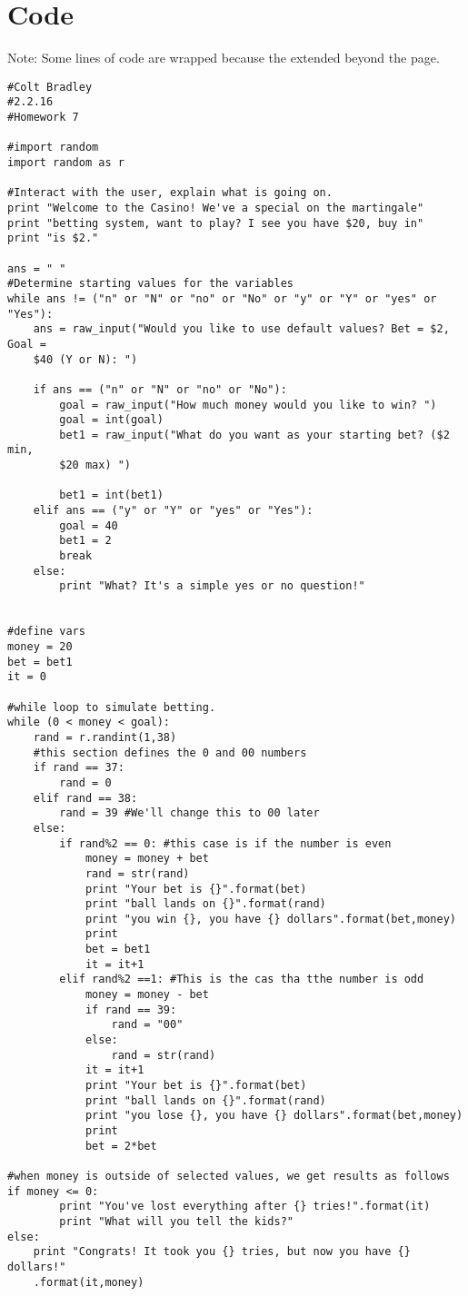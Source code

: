 \documentclass[11pt]{article}
\begin{document}
\section{Code}
Note: Some lines of code are wrapped because the extended beyond the page. 
\begin{verbatim}
#Colt Bradley
#2.2.16
#Homework 7

#import random
import random as r

#Interact with the user, explain what is going on. 
print "Welcome to the Casino! We've a special on the martingale"
print "betting system, want to play? I see you have $20, buy in"
print "is $2."

ans = " "
#Determine starting values for the variables
while ans != ("n" or "N" or "no" or "No" or "y" or "Y" or "yes" or "Yes"):
    ans = raw_input("Would you like to use default values? Bet = $2, Goal = 
    $40 (Y or N): ")
   
    if ans == ("n" or "N" or "no" or "No"):
        goal = raw_input("How much money would you like to win? ")
        goal = int(goal)
        bet1 = raw_input("What do you want as your starting bet? ($2 min, 
        $20 max) ")
        
        bet1 = int(bet1)
    elif ans == ("y" or "Y" or "yes" or "Yes"):
        goal = 40
        bet1 = 2
        break
    else:
        print "What? It's a simple yes or no question!"
    

#define vars
money = 20
bet = bet1
it = 0

#while loop to simulate betting. 
while (0 < money < goal): 
    rand = r.randint(1,38)
    #this section defines the 0 and 00 numbers
    if rand == 37:
        rand = 0
    elif rand == 38:
        rand = 39 #We'll change this to 00 later 
    else:
        if rand%2 == 0: #this case is if the number is even
            money = money + bet
            rand = str(rand)
            print "Your bet is {}".format(bet)
            print "ball lands on {}".format(rand)
            print "you win {}, you have {} dollars".format(bet,money)
            print
            bet = bet1
            it = it+1 
        elif rand%2 ==1: #This is the cas tha tthe number is odd
            money = money - bet
            if rand == 39:
                rand = "00"
            else:
                rand = str(rand)
            it = it+1
            print "Your bet is {}".format(bet)
            print "ball lands on {}".format(rand)
            print "you lose {}, you have {} dollars".format(bet,money)
            print
            bet = 2*bet
 
#when money is outside of selected values, we get results as follows  
if money <= 0:
        print "You've lost everything after {} tries!".format(it)
        print "What will you tell the kids?"
else:
    print "Congrats! It took you {} tries, but now you have {} dollars!"
    .format(it,money)
\end{verbatim}
\end{document}
